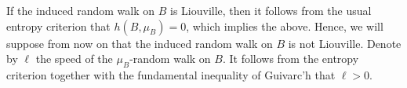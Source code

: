 \documentclass[reqno,oneside,11pt]{amsart}
\renewcommand{\P}{\mathbb{P}}
\newcommand{\supp}[1]{\mathrm{supp}(#1)}
\theoremstyle{plain}
\newtheorem{lem}[thm]{Lemma}
\theoremstyle{definition}
\begin{document}
If the induced random walk on $B$ is Liouville, then it follows from the usual entropy criterion that $h\left(B,\mu_B\right)=0$, which implies the above. Hence, we will suppose from now on that the induced random walk on $B$ is not Liouville. Denote by $\ell$ the speed of the $\mu_B$-random walk on $B$. It follows from the entropy criterion together with the fundamental inequality of Guivarc'h that $\ell>0$. 

%	
%		
\end{document}
